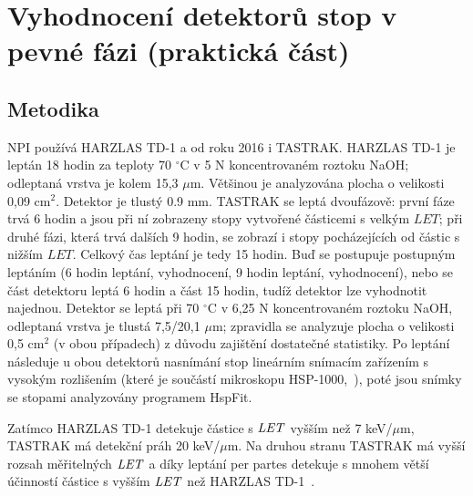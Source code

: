 \chapter{Vyhodnocení detektorů stop v pevné fázi (praktická část)}
\section{Metodika}\label{sec:praktickaCast_metodika}
NPI používá HARZLAS TD-1 a od roku 2016 i TASTRAK. HARZLAS TD-1 je leptán 18 hodin za teploty 70 $^{\circ}$C v 5 N koncentrovaném roztoku NaOH; odleptaná vrstva je kolem 15,3 $\mu$m. Většinou je analyzována plocha o velikosti 0,09 cm$^2$. Detektor je tlustý 0.9 mm. TASTRAK se leptá dvoufázově: první fáze trvá 6 hodin a jsou při ní zobrazeny stopy vytvořené částicemi s velkým $\mathit{LET}$; při druhé fázi, která trvá dalších 9 hodin, se zobrazí i stopy pocházejících od částic s nižším $\mathit{LET}$. Celkový čas leptání je tedy 15 hodin. Buď se postupuje postupným leptáním (6 hodin leptání, vyhodnocení, 9 hodin leptání, vyhodnocení), nebo se část detektoru leptá 6 hodin a část 15 hodin, tudíž
detektor lze vyhodnotit najednou. Detektor se leptá při 70 $^{\circ}$C v 6,25 N koncentrovaném roztoku NaOH, odleptaná vrstva je tlustá 7,5/20,1 $\mu$m; zpravidla se analyzuje plocha o velikosti 0,5 cm$^2$ (v obou případech) z důvodu zajištění dostatečné statistiky. Po leptání následuje u obou detektorů nasnímání stop lineárním snímacím zařízením s vysokým rozlišením (které je součástí mikroskopu HSP-1000,~\cite{dosis_HSP1000}), poté jsou snímky se stopami analyzovány programem HspFit.

Zatímco HARZLAS TD-1 detekuje částice s $\mathit{LET}$ vyšším než 7 keV/$\mu$m, TASTRAK má detekční práh 20 keV/$\mu$m. Na druhou stranu TASTRAK má vyšší rozsah měřitelných $\mathit{LET}$ a díky leptání per partes detekuje s mnohem větší účinností částice s vyšším $\mathit{LET}$ než HARZLAS TD-1~\cite{cesky}.
\newpage
